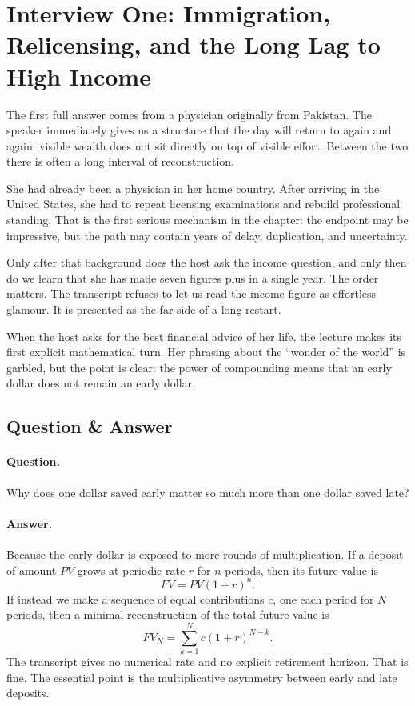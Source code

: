 \section{Interview One: Immigration, Relicensing, and the Long Lag to High Income}

The first full answer comes from a physician originally from Pakistan. The speaker immediately gives us a structure that the day will return to again and again: visible wealth does not sit directly on top of visible effort. Between the two there is often a long interval of reconstruction.

She had already been a physician in her home country. After arriving in the United States, she had to repeat licensing examinations and rebuild professional standing. That is the first serious mechanism in the chapter: the endpoint may be impressive, but the path may contain years of delay, duplication, and uncertainty.

Only after that background does the host ask the income question, and only then do we learn that she has made seven figures plus in a single year. The order matters. The transcript refuses to let us read the income figure as effortless glamour. It is presented as the far side of a long restart.

When the host asks for the best financial advice of her life, the lecture makes its first explicit mathematical turn. Her phrasing about the ``wonder of the world'' is garbled, but the point is clear: the power of compounding means that an early dollar does not remain an early dollar.

\subsection{Question \& Answer}

\paragraph{Question.} Why does one dollar saved early matter so much more than one dollar saved late?

\paragraph{Answer.} Because the early dollar is exposed to more rounds of multiplication. If a deposit of amount \(PV\) grows at periodic rate \(r\) for \(n\) periods, then its future value is
\begin{equation}
FV = PV(1+r)^n.
\end{equation}
If instead we make a sequence of equal contributions \(c\), one each period for \(N\) periods, then a minimal reconstruction of the total future value is
\begin{equation}
FV_N = \sum_{k=1}^{N} c(1+r)^{N-k}.
\end{equation}
The transcript gives no numerical rate and no explicit retirement horizon. That is fine. The essential point is the multiplicative asymmetry between early and late deposits.

